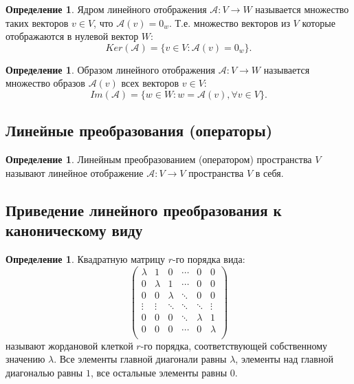 \documentclass[12pt]{report}
\theoremstyle{definition}
\newtheorem{definition}[theorem]{Определение}
\newcommand{\A}{\mathcal A}
\begin{document}
\begin{definition}
Ядром линейного отображения $\A: V \rightarrow W$ называется множество
таких векторов $v \in V$, что $\A(v) = 0_w$. Т.е. множество векторов из
$V$ которые отображаются в нулевой вектор $W$:
$$
Ker(\A) = \{v \in V: \A(v) = 0_w\}.
$$
\end{definition}

\begin{definition}
Образом линейного отображения $\A: V \rightarrow W$ называется
множество образов $\A(v)$ всех векторов $v \in V$:
$$
Im(\A) = \{w \in W: w = \A(v), \forall v \in V\}.
$$
\end{definition}

\subsection{Линейные преобразования (операторы)}
\begin{definition}
Линейным преобразованием (оператором) пространства $V$ называют
линейное отображение $\A: V \rightarrow V$ пространства $V$ в себя.
\end{definition}

\subsection{Приведение линейного преобразования к каноническому виду}

\begin{definition}
Квадратную матрицу $r$-го порядка вида:
$$
\begin{pmatrix}
\lambda & 1       & 0             & \cdots & 0       & 0      \\
0           & \lambda & 1             & \cdots & 0       & 0      \\
0           & 0       & \lambda       & \ddots & 0       & 0      \\
\vdots   & \vdots  & \ddots     & \ddots & \ddots  & \vdots \\
0           & 0       & 0             & \ddots & \lambda & 1      \\
0           & 0       & 0             & \cdots & 0       & \lambda \\
\end{pmatrix}
$$
называют жордановой клеткой $r$-го порядка, соответствующей собственному
значению $\lambda$.
Все элементы главной диагонали равны $\lambda$, элементы над
главной диагональю равны $1$, все остальные элементы равны $0$.
\end{definition}
\end{document}
